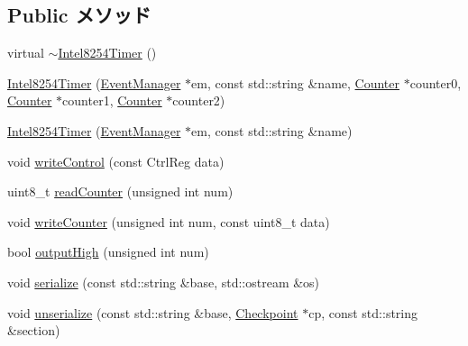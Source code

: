 \subsection*{Public メソッド}
\begin{DoxyCompactItemize}
\item 
virtual \hyperlink{classIntel8254Timer_a97226cbfed0e2865203c48edd9f5f567}{$\sim$Intel8254Timer} ()
\item 
\hyperlink{classIntel8254Timer_a33260f6578db0088fbdfa3d3dbcce9ba}{Intel8254Timer} (\hyperlink{classEventManager}{EventManager} $\ast$em, const std::string \&name, \hyperlink{classIntel8254Timer_1_1Counter}{Counter} $\ast$counter0, \hyperlink{classIntel8254Timer_1_1Counter}{Counter} $\ast$counter1, \hyperlink{classIntel8254Timer_1_1Counter}{Counter} $\ast$counter2)
\item 
\hyperlink{classIntel8254Timer_a0805f3ad08a23ef608bb05d72d15c26e}{Intel8254Timer} (\hyperlink{classEventManager}{EventManager} $\ast$em, const std::string \&name)
\item 
void \hyperlink{classIntel8254Timer_a743f89777689003889da83c129eaae33}{writeControl} (const CtrlReg data)
\item 
uint8\_\-t \hyperlink{classIntel8254Timer_a4794298e519275c38d6d8a8f169fd53b}{readCounter} (unsigned int num)
\item 
void \hyperlink{classIntel8254Timer_aa5af88439002d1cfeb0189113dfe4627}{writeCounter} (unsigned int num, const uint8\_\-t data)
\item 
bool \hyperlink{classIntel8254Timer_ab3ebc39ad58dd927f9da6958c45203a2}{outputHigh} (unsigned int num)
\item 
void \hyperlink{classIntel8254Timer_ab4138b21b48e3371a8e20df72b675a88}{serialize} (const std::string \&base, std::ostream \&os)
\item 
void \hyperlink{classIntel8254Timer_a147c320e3d6506edf5587a40cd8e430d}{unserialize} (const std::string \&base, \hyperlink{classCheckpoint}{Checkpoint} $\ast$cp, const std::string \&section)
\end{DoxyCompactItemize}
